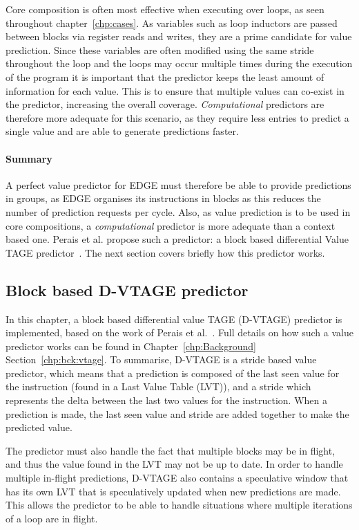 Core composition is often most effective when executing over loops, as seen throughout chapter~\ref{chp:cases}.
As variables such as loop inductors are passed between blocks via register reads and writes, they are a prime candidate for value prediction.
Since these variables are often modified using the same stride throughout the loop and the loops may occur multiple times during the execution of the program it is important that the predictor keeps the least amount of information for each value.
This is to ensure that multiple values can co-exist in the predictor, increasing the overall coverage.
\textit{Computational} predictors are therefore more adequate for this scenario, as they require less entries to predict a single value and are able to generate predictions faster.


\paragraph*{Summary}

A perfect value predictor for EDGE must therefore be able to provide predictions in groups, as EDGE organises its instructions in blocks as this reduces the number of prediction requests per cycle.
Also, as value prediction is to be used in core compositions, a \textit{computational} predictor is more adequate than a context based one.
Perais et al. propose such a predictor: a block based differential Value TAGE predictor~\cite{peraisBeBop2015}.
The next section covers briefly how this predictor works.

\subsection{Block based D-VTAGE predictor}

In this chapter, a block based differential value TAGE (D-VTAGE) predictor is implemented, based on the work of Perais et al.~\cite{peraisBeBop2015}.
Full details on how such a value predictor works can be found in Chapter~\ref{chp:Background} Section~\ref{chp:bck:vtage}.
To summarise, D-VTAGE is a stride based value predictor, which means that a prediction is composed of the last seen value for the instruction (found in a Last Value Table (LVT)), and a stride which represents the delta between the last two values for the instruction.
When a prediction is made, the last seen value and stride are added together to make the predicted value.

The predictor must also handle the fact that multiple blocks may be in flight, and thus the value found in the LVT may not be up to date.
In order to handle multiple in-flight predictions, D-VTAGE also contains a speculative window that has its own LVT that is speculatively updated when new predictions are made.
This allows the predictor to be able to handle situations where multiple iterations of a loop are in flight.

